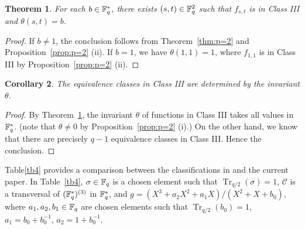 \documentclass{amsart}
\newtheorem{thm}{Theorem}[section]
\newtheorem{cor}[thm]{Corollary}
\numberwithin{equation}{section}
\theoremstyle{definition}
\newcommand{\f}{\Bbb F}
\DeclareMathOperator{\trace}{\mathrm{Tr}}
\begin{document}
\begin{thm}\label{thm:theta-onto}
For each $b\in\f_q^*$, there exists $(s,t)\in\f_q^2$ such that $f_{s,t}$ is in Class III and $\theta(s,t)=b$.
\end{thm}

\begin{proof}
If $b\ne 1$, the conclusion follows from Theorem~\ref{thm:p=2} and Proposition~\ref{prop:p=2} (ii). If $b=1$, we have $\theta(1,1)=1$, where $f_{1,1}$ is in Class III by Proposition~\ref{prop:p=2} (ii).
\end{proof}

\begin{cor}\label{cor:p=2}
The equivalence classes in Class III are determined by the invariant $\theta$.
\end{cor}

\begin{proof}
By Theorem~\ref{thm:theta-onto}, the invariant $\theta$ of functions in Class III takes all values in $\f_q^*$. (note that $\theta\ne 0$ by Proposition~\ref{prop:p=2} (i).) On the other hand, we know that there are precisely $q-1$ equivalence classes in Class III. Hence the conclusion.
\end{proof}

Table\ref{tb4} provides a comparison between the classifications in \cite{Mattarei-Pizzato-JAA-2024} and the current paper.
In Table~\ref{tb4}, $\sigma\in\f_q$ is a chosen element such that $\trace_{q/2}(\sigma)=1$,  $\mathcal C$ is a transversal of $(\f_q^*)^{(3)}$ in $\f_q^*$, and $g=(X^3+a_2X^2+a_1X)/(X^2+X+b_0)$, where $a_1,a_2,b_1\in\f_q$ are chosen elements such that $\trace_{q/2}(b_0)=1$, $a_1=b_0+b_0^{-1}$, $a_2=1+b_0^{-1}$.
\end{document}

